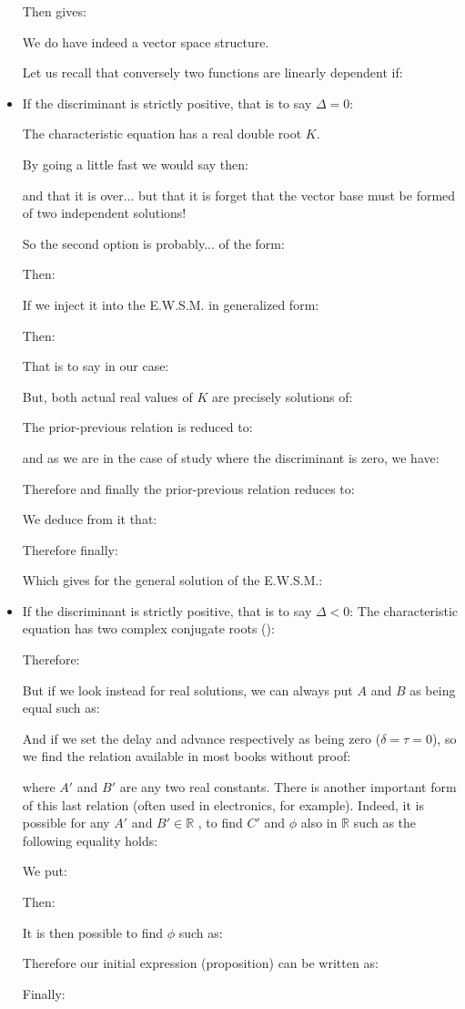 \begin{itemize}
		Then gives:
		
		We do have indeed a vector space structure.
		
		Let us recall that conversely two functions are linearly dependent if:
		
		\item If the discriminant is strictly positive, that is to say $\Delta=0$: 
		
		The characteristic equation has a real double root $K$.
		
		By going a little fast we would say then:
		
		and that it is over... but that it is forget that the vector base must be formed of two independent solutions!
		
		So the second option is probably... of the form:
		
		Then:
		
		If we inject it into the E.W.S.M. in generalized form:
		
		Then:
		
		That is to say in our case:
		
		But, both actual real values of $K$ are precisely solutions of:
		
		The prior-previous relation is reduced to:
		
		and as we are in the case of study where the discriminant is zero, we have:
		
		Therefore and finally the prior-previous relation reduces to:
		
		We deduce from it that:
		
		Therefore finally:
		
		Which gives for the general solution of the E.W.S.M.:
		
		
		\item If the discriminant is strictly positive, that is to say $\Delta<0$:
		The characteristic equation has two complex conjugate roots ():
		
		Therefore:
		
		But if we look instead for real solutions, we can always put $A$ and $B$ as being equal such as:
		
		And if we set the delay and advance respectively as being zero ($\delta=\tau=0$), so we find the relation available in most books without proof:
		
		where $A'$ and $B'$ are any two real constants. There is another important form of this last relation (often used in electronics, for example). Indeed, it is possible for any $A'$ and $B' \in \mathbb{R}$ , to find $C'$ and $\phi$ also in $\mathbb{R}$ such as the following equality holds:
		
		We put:
		
		Then:
		
		It is then possible to find $\phi$ such as:
		
		Therefore our initial expression (proposition) can be written as:
		
		Finally:
		
	\end{itemize}

